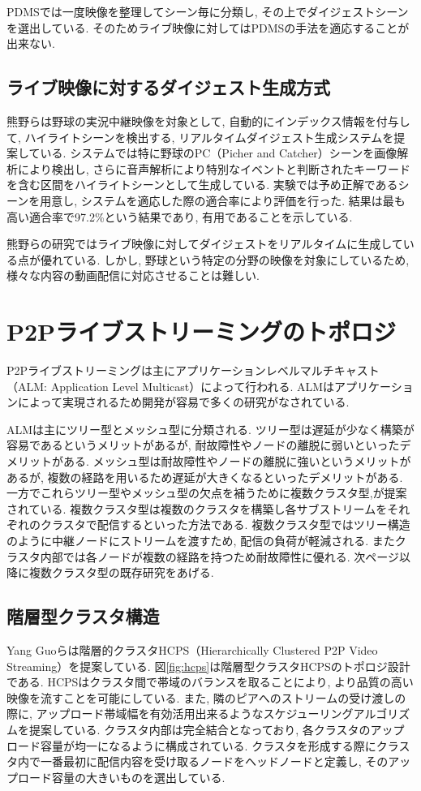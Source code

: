 PDMSでは一度映像を整理してシーン毎に分類し, その上でダイジェストシーンを選出している. そのためライブ映像に対してはPDMSの手法を適応することが出来ない.

\subsection{ライブ映像に対するダイジェスト生成方式}
熊野らは野球の実況中継映像を対象として, 自動的にインデックス情報を付与して, ハイライトシーンを検出する, リアルタイムダイジェスト生成システム\cite{yakyu}を提案している. システムでは特に野球のPC（Picher and Catcher）シーンを画像解析により検出し, さらに音声解析により特別なイベントと判断されたキーワードを含む区間をハイライトシーンとして生成している. 実験では予め正解であるシーンを用意し, システムを適応した際の適合率により評価を行った. 結果は最も高い適合率で97.2\%という結果であり, 有用であることを示している.

熊野らの研究ではライブ映像に対してダイジェストをリアルタイムに生成している点が優れている. しかし, 野球という特定の分野の映像を対象にしているため, 様々な内容の動画配信に対応させることは難しい.

\newpage

\section{P2Pライブストリーミングのトポロジ}
P2Pライブストリーミングは主にアプリケーションレベルマルチキャスト（ALM: Application Level Multicast）によって行われる. ALMはアプリケーションによって実現されるため開発が容易で多くの研究がなされている.

ALMは主にツリー型とメッシュ型に分類される. ツリー型は遅延が少なく構築が容易であるというメリットがあるが, 耐故障性やノードの離脱に弱いといったデメリットがある. メッシュ型は耐故障性やノードの離脱に強いというメリットがあるが, 複数の経路を用いるため遅延が大きくなるといったデメリットがある. 一方でこれらツリー型やメッシュ型の欠点を補うために複数クラスタ型\cite{dis},\cite{streamline}が提案されている. 複数クラスタ型は複数のクラスタを構築し各サブストリームをそれぞれのクラスタで配信するといった方法である. 複数クラスタ型ではツリー構造のように中継ノードにストリームを渡すため, 配信の負荷が軽減される. またクラスタ内部では各ノードが複数の経路を持つため耐故障性に優れる. 次ページ以降に複数クラスタ型の既存研究をあげる.

\newpage

\subsection{階層型クラスタ構造}
Yang Guoらは階層的クラスタHCPS（Hierarchically Clustered P2P Video Streaming）を提案している\cite{hcps}. 図\ref{fig:hcps}は階層型クラスタHCPSのトポロジ設計である. HCPSはクラスタ間で帯域のバランスを取ることにより, より品質の高い映像を流すことを可能にしている. また, 隣のピアへのストリームの受け渡しの際に, アップロード帯域幅を有効活用出来るようなスケジューリングアルゴリズムを提案している. クラスタ内部は完全結合となっており, 各クラスタのアップロード容量が均一になるように構成されている. クラスタを形成する際にクラスタ内で一番最初に配信内容を受け取るノードをヘッドノードと定義し, そのアップロード容量の大きいものを選出している.

